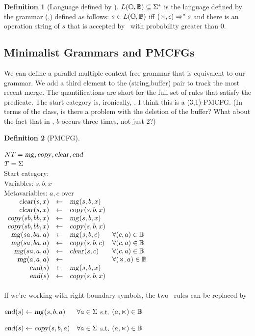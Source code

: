 \documentclass[12pt]{article}
\theoremstyle{definition}
\newtheorem{definition}{Definition}[section]
\begin{document}
\begin{definition}[Language defined by \OURG]
$L(\mathbb{O},\mathbb{B})\subseteq\Sigma^*$ is the language defined by the grammar (\OPS,\BIGR) defined as follows:   $s\in L(\mathbb{O},\mathbb{B})$ iff $(\rtimes,\epsilon)\Rightarrow^*s$ and there is an operation string of $s$ that is accepted by \OPS~with probability greater than 0.
\end{definition}


\subsection{Minimalist Grammars and PMCFGs}
\label{sec:minimalist-grammars}


We can define a parallel multiple context free grammar that is equivalent to our grammar. We add a third element to the (string,buffer) pair to track the most recent merge. The quantifications are short for the full set of rules that satisfy the predicate. The start category is, ironically, \ed.
I think this is a (3,1)-PMCFG. (In terms of the class, is there a problem with the deletion of the buffer? What about the fact that in \cp, $b$ occurs three times, not just 2?)

\begin{definition}[PMCFG]\

  \noindent$NT = \text{\textsl{mg}},\text{\textsl{copy}},\text{\textsl{clear}},\text{\textsl{end}}$\\
  $T = \Sigma$\\
  Start category: \ed\\
  Variables: $s,b,x$\\
  Metavariables: $a,c$ over \sg\\
  
$  \begin{array}{r c l l}
    \text{\textsl{clear}}(s,x) &\leftarrow& \text{\textsl{mg}}(s,b,x)\\
    \text{\textsl{clear}}(s,x) &\leftarrow& \text{\textsl{copy}}(s,b,x)\\
    \text{\textsl{copy}}(sb,bb,x) &\leftarrow& \text{\textsl{mg}}(s,b,x)\\
    \text{\textsl{copy}}(sb,bb,x) &\leftarrow& \text{\textsl{copy}}(s,b,x)\\
    \text{\textsl{mg}}(sa,ba,a) &\leftarrow& \text{\textsl{mg}}(s,b,c) & \forall (c,a)\in\mathbb{B}\\
    \text{\textsl{mg}}(sa,ba,a) &\leftarrow& \text{\textsl{copy}}(s,b,c)&\forall (c,a)\in\mathbb{B}\\
    \text{\textsl{mg}}(sa,a,a) &\leftarrow& \text{\textsl{clear}}(s,c) &\forall (c,a)\in\mathbb{B}\\
    \text{\textsl{mg}}(a,a,a) &\leftarrow&  &\forall(\rtimes,a)\in\mathbb{B}\\
    \text{\textsl{end}}(s) &\leftarrow& \text{\textsl{mg}}(s,b,x)\\
    \text{\textsl{end}}(s) &\leftarrow& \text{\textsl{copy}}(s,b,x)\\    
   \end{array}$\\\\

   If we're working with right boundary symbols, the two \ed~rules can be replaced by
   
   $\text{\textsl{end}}(s)\leftarrow\text{\textsl{mg}}(s,b,a) ~~~~~\forall a\in\Sigma$ s.t. $(a,\ltimes)\in\mathbb{B}$
   
   $\text{\textsl{end}}(s)\leftarrow\text{\textsl{copy}}(s,b,a) ~~~\forall a\in\Sigma$ s.t. $(a,\ltimes)\in\mathbb{B}$
\label{def:pmcfg}
 \end{definition}
\end{document}
